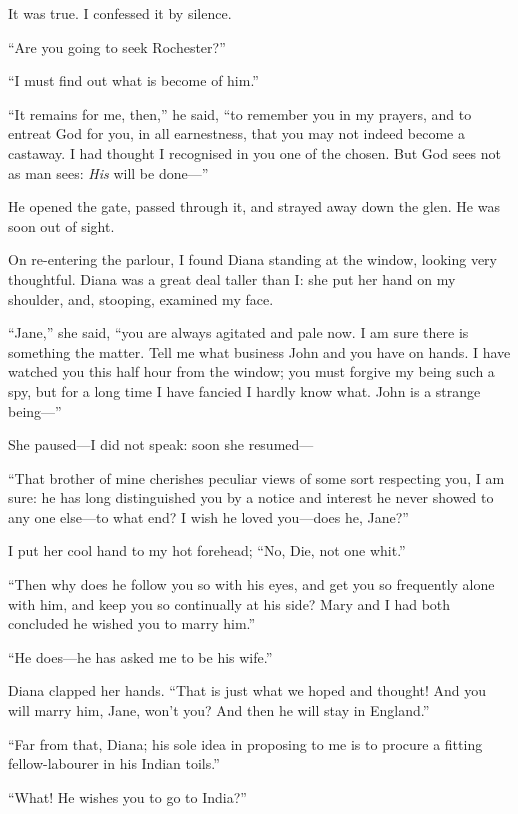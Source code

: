 It was true. I confessed it by silence.

\enquote{Are you going to seek \Mr{} Rochester?}

\enquote{I must find out what is become of him.}

\enquote{It remains for me, then,} he said, \enquote{to remember you in my
	prayers, and to entreat God for you, in all earnestness, that you may
	not indeed become a castaway. I had thought I recognised in you one of
	the chosen. But God sees not as man sees: \emph{His} will be done---}

He opened the gate, passed through it, and strayed away down the glen.
He was soon out of sight.

On re-entering the parlour, I found Diana standing at the window,
looking very thoughtful. Diana was a great deal taller than I: she put
her hand on my shoulder, and, stooping, examined my face.

\enquote{Jane,} she said, \enquote{you are always agitated and pale
	now. I am sure there is something the matter. Tell me what business
	\St{} John and you have on hands. I have watched you this half hour from
	the window; you must forgive my being such a spy, but for a long time I
	have fancied I hardly know what. \St{} John is a strange being---}

She paused---I did not speak: soon she resumed---

\enquote{That brother of mine cherishes peculiar views of some sort
	respecting you, I am sure: he has long distinguished you by a notice and
	interest he never showed to any one else---to what end? I wish he loved
	you---does he, Jane?}

I put her cool hand to my hot forehead; \enquote{No, Die, not one whit.}

\enquote{Then why does he follow you so with his eyes, and get you so
	frequently alone with him, and keep you so continually at his side?
	Mary and I had both concluded he wished you to marry him.}

\enquote{He does---he has asked me to be his wife.}

Diana clapped her hands. \enquote{That is just what we hoped and
	thought! And you will marry him, Jane, won't you? And then he will
	stay in England.}

\enquote{Far from that, Diana; his sole idea in proposing to me is to
	procure a fitting fellow-labourer in his Indian toils.}

\enquote{What! He wishes you to go to India?}

